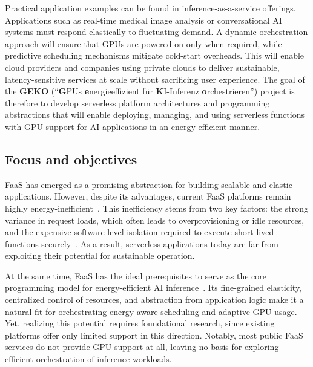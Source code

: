 Practical application examples can be found in inference-as-a-service offerings.
Applications such as real-time medical image analysis or conversational AI systems must respond elastically to fluctuating demand.
A dynamic orchestration approach will ensure that GPUs are powered on only when required, while predictive scheduling mechanisms mitigate cold-start overheads.
This will enable cloud providers and companies using private clouds to deliver sustainable, latency-sensitive services at scale without sacrificing user experience.
The goal of the \textbf{GEKO} (\enquote{\textbf{G}PUs \textbf{e}nergieeffizient für \textbf{K}I-Inferenz \textbf{o}rchestrieren}) project is therefore to develop serverless platform architectures and programming abstractions that will enable deploying, managing, and using serverless functions with GPU support for AI applications in an energy-efficient manner.

\subsection{Focus and objectives}

FaaS has emerged as a promising abstraction for building scalable and elastic applications.
However, despite its advantages, current FaaS platforms remain highly energy-inefficient~\cite{sharma_challenges_2023}. 
This inefficiency stems from two key factors: the strong variance in request loads, which often leads to overprovisioning or idle resources, and the expensive software-level isolation required to execute short-lived functions securely~\cite{schirmer2023nightshift,ginzburg_serverless_2020}.
As a result, serverless applications today are far from exploiting their potential for sustainable operation.

At the same time, FaaS has the ideal prerequisites to serve as the core programming model for energy-efficient AI inference~\cite{patros_2021_towards_sustainable_serverless}.
Its fine-grained elasticity, centralized control of resources, and abstraction from application logic make it a natural fit for orchestrating energy-aware scheduling and adaptive GPU usage. 
Yet, realizing this potential requires foundational research, since existing platforms offer only limited support in this direction. 
Notably, most public FaaS services do not provide GPU support at all, leaving no basis for exploring efficient orchestration of inference workloads.

